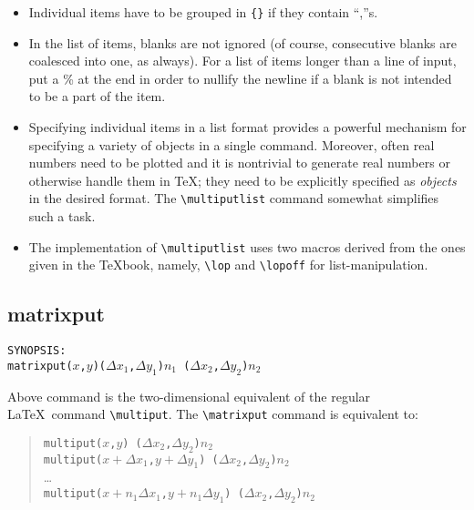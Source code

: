 \begin{itemize}
\item Individual items have to be grouped in \verb|{}| if they contain ``,''s.

\item In the list of items, blanks are not ignored (of course, consecutive
blanks are coalesced into one, as always). For a list of items longer than a
line of input, put a \% at the end in order to nullify the newline if a
blank is not intended to be a part of the item.

\item Specifying individual items in a list format provides a powerful
mechanism for specifying a variety of objects in a single command.
Moreover, often real numbers need to be plotted and
it is nontrivial to generate real numbers or otherwise
handle them in \TeX; they need to be explicitly specified as {\it objects} in
the desired format.
The \verb|\multiputlist| command somewhat simplifies such a task.

\item The implementation of \verb|\multiputlist| uses two macros derived from
the ones given in the \TeX book, namely, \verb|\lop| and \verb|\lopoff| for
list-manipulation.
\end{itemize}

\subsection{{\tt \bs}matrixput}
{\tt SYNOPSIS:\\
\hspace*{\leftmargin}%
\bs matrixput($x$,$y$)($\Delta x_1$,$\Delta y_1$)\lb $n_1$\rb
($\Delta x_2$,$\Delta y_2$)\lb $n_2$\rb {}\rb}

Above command is the two-dimensional equivalent of the regular \LaTeX\ command
\verb|\multiput|. The \verb|\matrixput| command is equivalent to:

\begin{quote}
{\tt \bs multiput($x$,$y$)%
($\Delta x_2$,$\Delta y_2$)\lb $n_2$\rb{}\rb}\\
{\tt \bs multiput($x + \Delta x_1$,$y + \Delta y_1$)%
($\Delta x_2$,$\Delta y_2$)\lb $n_2$\rb{}\rb}\\
\ldots\\
{\tt \bs multiput($x + n_1 \Delta x_1$,$y + n_1\Delta y_1$)%
($\Delta x_2$,$\Delta y_2$)\lb $n_2$\rb{}\rb}
\end{quote}

